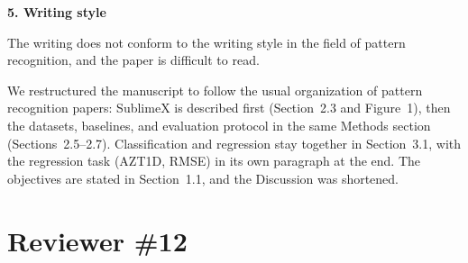 \documentclass[11pt]{article}
\makeatletter
\newcommand{\rsp}{\par\vspace{0.9em}}
\newcommand{\rcitem}[2]{\begin{reviewerbox}\textbf{#1}\par\smallskip#2\end{reviewerbox}}
\newcommand{\response}[2]{%
  \begin{responsebox}#1%
  \def\@responseitems{#2}%
  \ifx\@responseitems\empty\else\begin{itemize}[nosep,leftmargin=1.2em]#2\end{itemize}\fi
  \end{responsebox}\rsp}
\makeatother
\begin{document}
\rcitem{5. Writing style}{The writing does not conform to the writing style in the field of pattern
recognition, and the paper is difficult to read.}

\response{We restructured the manuscript to follow the usual organization of pattern recognition
papers: SublimeX is described first (Section~2.3 and Figure~1), then the datasets, baselines, and
evaluation protocol in the same Methods section (Sections~2.5--2.7). Classification and regression
stay together in Section~3.1, with the regression task (AZT1D, RMSE) in its own paragraph at the
end. The objectives are stated in Section~1.1, and the Discussion was shortened.}{}

\section*{Reviewer \#12}
\end{document}
